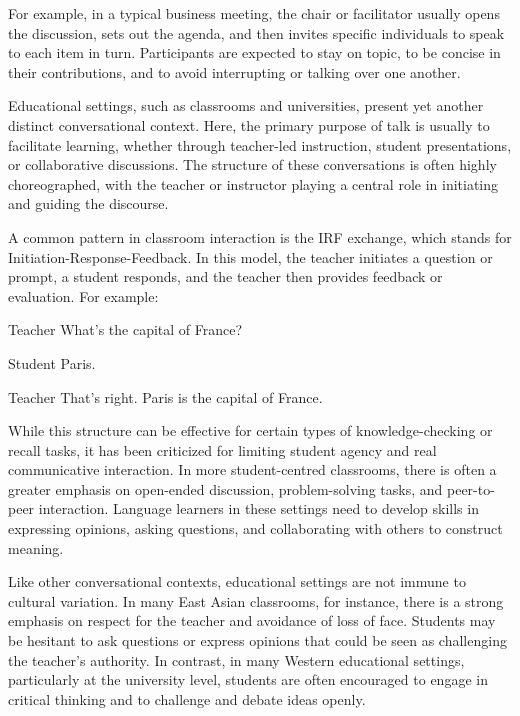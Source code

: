For example, in a typical business meeting, the chair or facilitator usually opens the discussion, sets out the agenda, and then invites specific individuals to speak to each item in turn. Participants are expected to stay on topic, to be concise in their contributions, and to avoid interrupting or talking over one another.

Educational settings, such as classrooms and universities, present yet another distinct conversational context. Here, the primary purpose of talk is usually to facilitate learning, whether through teacher-led instruction, student presentations, or collaborative discussions. The structure of these conversations is often highly choreographed, with the teacher or instructor playing a central role in initiating and guiding the discourse.

A common pattern in classroom interaction is the IRF exchange, which stands for Initiation-Response-Feedback. In this model, the teacher initiates a question or prompt, a student responds, and the teacher then provides feedback or evaluation. For example:

\begin{dialogue}
\item[Teacher] What's the capital of France?
\item[Student] Paris.
\item[Teacher] That's right. Paris is the capital of France.
\end{dialogue}

While this structure can be effective for certain types of knowledge-checking or recall tasks, it has been criticized for limiting student agency and real communicative interaction. In more student-centred classrooms, there is often a greater emphasis on open-ended discussion, problem-solving tasks, and peer-to-peer interaction. Language learners in these settings need to develop skills in expressing opinions, asking questions, and collaborating with others to construct meaning.

Like other conversational contexts, educational settings are not immune to cultural variation. In many East Asian classrooms, for instance, there is a strong emphasis on respect for the teacher and avoidance of loss of face. Students may be hesitant to ask questions or express opinions that could be seen as challenging the teacher's authority. In contrast, in many Western educational settings, particularly at the university level, students are often encouraged to engage in critical thinking and to challenge and debate ideas openly.

